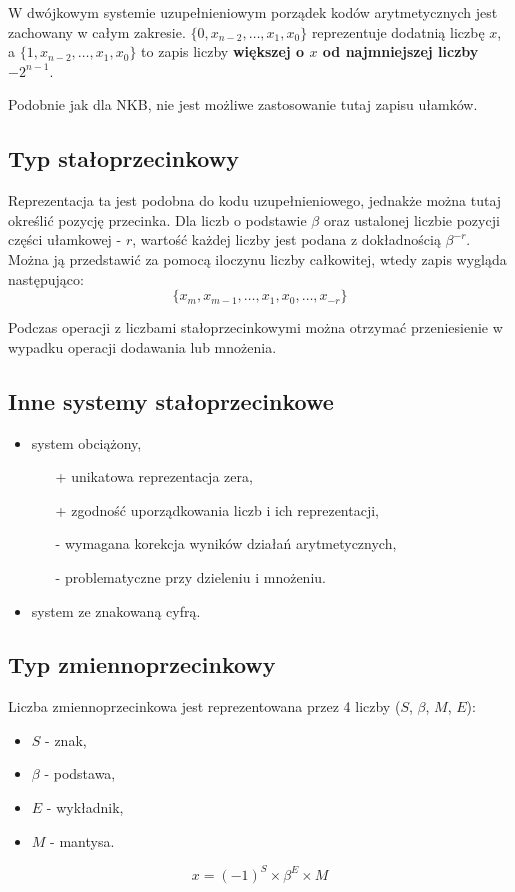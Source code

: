 W dwójkowym systemie uzupełnieniowym porządek kodów arytmetycznych jest zachowany w całym zakresie. $\{0, x_{n-2},\ldots,x_{1},x_{0}\}$ reprezentuje dodatnią liczbę $x$, a $\{1, x_{n-2},\ldots,x_{1},x_{0}\}$ to zapis liczby \textbf{większej o $x$ od najmniejszej liczby $-2^{n-1}$}.

Podobnie jak dla NKB, nie jest możliwe zastosowanie tutaj zapisu ułamków.

\subsection{Typ stałoprzecinkowy}
Reprezentacja ta jest podobna do kodu uzupełnieniowego, jednakże można tutaj określić pozycję przecinka. Dla liczb o podstawie $\beta$ oraz ustalonej liczbie pozycji części ułamkowej - $r$, wartość każdej liczby jest podana z dokładnością $\beta^{-r}$. Można ją przedstawić za pomocą iloczynu liczby całkowitej, wtedy zapis wygląda następująco:
\begin{equation}
\{x_{m},x_{m-1},\ldots,x_{1},x_{0},\ldots,x_{-r}\}
\end{equation}

Podczas operacji z liczbami stałoprzecinkowymi można otrzymać przeniesienie w wypadku operacji dodawania lub mnożenia.

\subsection{Inne systemy stałoprzecinkowe}
\begin{itemize}
\item system obciążony,
\begin{itemize}
\item[+] unikatowa reprezentacja zera,
\item[+] zgodność uporządkowania liczb i ich reprezentacji,
\item[-] wymagana korekcja wyników działań arytmetycznych,
\item[-] problematyczne przy dzieleniu i mnożeniu.
\end{itemize}
\item system ze znakowaną cyfrą.
\end{itemize}

\subsection{Typ zmiennoprzecinkowy}

Liczba zmiennoprzecinkowa jest reprezentowana przez 4 liczby ($S$, $\beta$, $M$, $E$):
\begin{itemize}
\item $S$ - znak,
\item $\beta$ - podstawa,
\item $E$ - wykładnik,
\item $M$ - mantysa.
\end{itemize}
\begin{equation}
x = (-1)^{S} \times \beta^{E} \times M
\end{equation}

